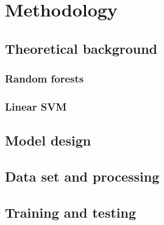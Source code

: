 \section{Methodology}
\subsection{Theoretical background}
\subsubsection{Random forests}
\subsubsection{Linear SVM}
\subsection{Model design}
\subsection{Data set and processing}
\subsection{Training and testing}




